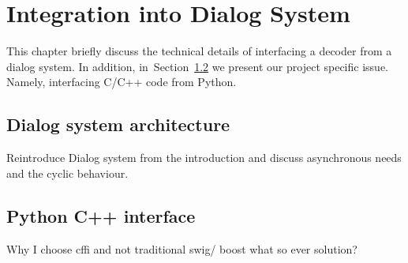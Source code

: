 \chapter{Integration into Dialog System}
\label{cha:integration_into_dialog_system}
This chapter briefly discuss the technical details of interfacing
a decoder from a dialog system.
In addition, in~Section~\ref{sec:python_c_interface} we present our project specific issue.
Namely, interfacing C/C++ code from Python.

\section{Dialog system architecture} 
\label{sec:dialog_system_architecture}
Reintroduce Dialog system from the introduction and discuss asynchronous needs
and the cyclic behaviour.



\section{Python C++ interface} 
\label{sec:python_c_interface}
Why I choose cffi and not traditional swig/ boost what so ever solution?



